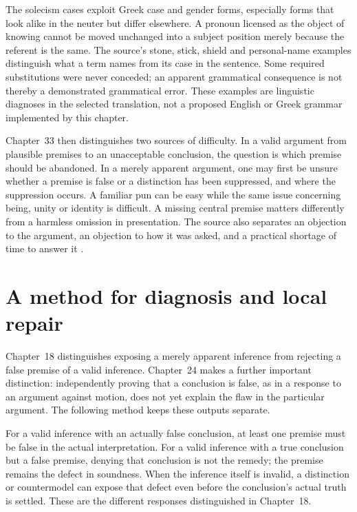 The solecism cases exploit Greek case and gender forms, especially
forms that look alike in the neuter but differ elsewhere. A pronoun
licensed as the object of knowing cannot be moved unchanged into a
subject position merely because the referent is the same. The source's
stone, stick, shield and personal-name examples distinguish what a
term names from its case in the sentence. Some required substitutions
were never conceded; an apparent grammatical consequence is not thereby
a demonstrated grammatical error. These examples are linguistic
diagnoses in the selected translation, not a proposed English or Greek
grammar implemented by this chapter.

Chapter~33 then distinguishes two sources of difficulty. In a valid
argument from plausible premises to an unacceptable conclusion, the
question is which premise should be abandoned. In a merely apparent
argument, one may first be unsure whether a premise is false or a
distinction has been suppressed, and where the suppression occurs.
A familiar pun can be easy while the same issue concerning being,
unity or identity is difficult. A missing central premise matters
differently from a harmless omission in presentation. The source also
separates an objection to the argument, an objection to how it was
asked, and a practical shortage of time to answer it
\cite[chaps.~31--33]{AristotleSophisticalRefutationsPickardCambridgeMIT}.

\section{A method for diagnosis and local repair}

Chapter~18 distinguishes exposing a merely apparent inference from
rejecting a false premise of a valid inference. Chapter~24 makes a
further important distinction: independently proving that a conclusion
is false, as in a response to an argument against motion, does not
yet explain the flaw in the particular argument. The following method
keeps these outputs separate.

For a valid inference with an actually false conclusion, at least
one premise must be false in the actual interpretation. For a valid
inference with a true conclusion but a false premise, denying that
conclusion is not the remedy; the premise remains the defect in
soundness. When the inference itself is invalid, a distinction or
countermodel can expose that defect even before the conclusion's
actual truth is settled. These are the different responses distinguished
in Chapter~18.


